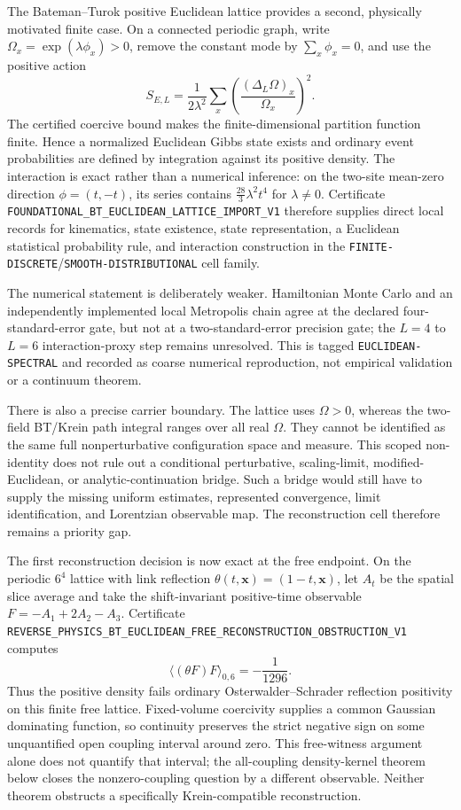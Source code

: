 \documentclass[11pt]{article}
\theoremstyle{definition}
\theoremstyle{remark}
\newcommand{\cert}[1]{\nolinkurl{#1}}
\newcommand{\rtype}[1]{\nolinkurl{#1}}
\begin{document}
The Bateman--Turok positive Euclidean lattice provides a second, physically
motivated finite case.  On a connected periodic graph, write
$\Omega_x=\exp(\lambda\phi_x)>0$, remove the constant mode by
$\sum_x\phi_x=0$, and use the positive action
\[
 S_{E,L}=\frac{1}{2\lambda^2}\sum_x
 \left(\frac{(\Delta_L\Omega)_x}{\Omega_x}\right)^2 .
\]
The certified coercive bound makes the finite-dimensional partition function
finite.  Hence a normalized Euclidean Gibbs state exists and ordinary event
probabilities are defined by integration against its positive density.  The
interaction is exact rather than a numerical inference: on the two-site
mean-zero direction $\phi=(t,-t)$, its series contains
$\frac{28}{3}\lambda^2t^4$ for $\lambda\ne0$.  Certificate
\cert{FOUNDATIONAL_BT_EUCLIDEAN_LATTICE_IMPORT_V1} therefore supplies direct
local records for kinematics, state existence, state representation, a
Euclidean statistical probability rule, and interaction construction in the
\rtype{FINITE-DISCRETE}/\rtype{SMOOTH-DISTRIBUTIONAL} cell family.

The numerical statement is deliberately weaker.  Hamiltonian Monte Carlo and
an independently implemented local Metropolis chain agree at the declared
four-standard-error gate, but not at a two-standard-error precision gate; the
$L=4$ to $L=6$ interaction-proxy step remains unresolved.  This is tagged
\rtype{EUCLIDEAN-SPECTRAL} and recorded as coarse numerical reproduction, not
empirical validation or a continuum theorem.

There is also a precise carrier boundary.  The lattice uses $\Omega>0$,
whereas the two-field BT/Krein path integral ranges over all real $\Omega$.
They cannot be identified as the same full nonperturbative configuration space
and measure.  This scoped non-identity does not rule out a conditional
perturbative, scaling-limit, modified-Euclidean, or analytic-continuation
bridge.  Such a bridge would still have to supply the missing uniform
estimates, represented convergence, limit identification, and Lorentzian
observable map.  The reconstruction cell therefore remains a priority gap.

The first reconstruction decision is now exact at the free endpoint.  On the
periodic \(6^4\) lattice with link reflection
\(\theta(t,\mathbf x)=(1-t,\mathbf x)\), let \(A_t\) be the spatial slice
average and take the shift-invariant positive-time observable
\(F=-A_1+2A_2-A_3\).  Certificate
\cert{REVERSE_PHYSICS_BT_EUCLIDEAN_FREE_RECONSTRUCTION_OBSTRUCTION_V1}
computes
\[
                 \langle(\theta F)F\rangle_{0,6}=-\frac1{1296}.
\]
Thus the positive density fails ordinary Osterwalder--Schrader reflection
positivity on this finite free lattice.  Fixed-volume coercivity supplies a
common Gaussian dominating function, so continuity preserves the strict
negative sign on some unquantified open coupling interval around zero.  This
free-witness argument alone does not quantify that interval; the all-coupling
density-kernel theorem below closes the nonzero-coupling question by a
different observable.  Neither theorem obstructs a specifically
Krein-compatible reconstruction.
\end{document}
